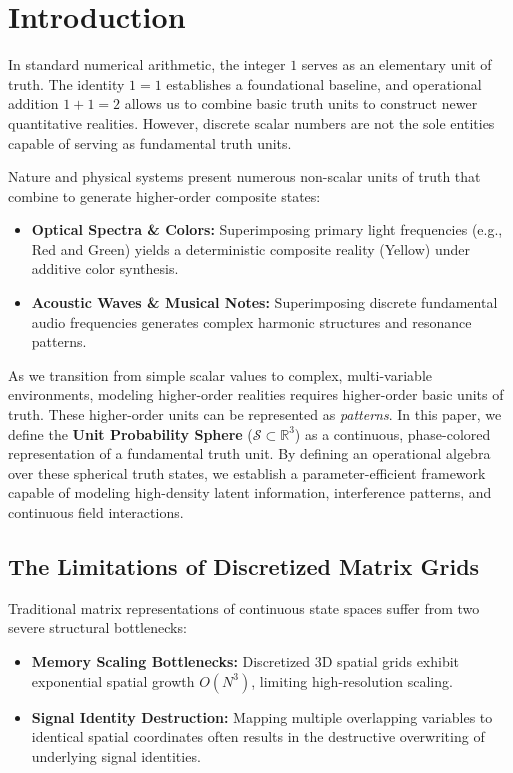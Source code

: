 \documentclass[12pt, a4paper]{article}
\begin{document}
\section{Introduction}

In standard numerical arithmetic, the integer $1$ serves as an elementary unit of truth. The identity $1 = 1$ establishes a foundational baseline, and operational addition $1 + 1 = 2$ allows us to combine basic truth units to construct newer quantitative realities. However, discrete scalar numbers are not the sole entities capable of serving as fundamental truth units.

Nature and physical systems present numerous non-scalar units of truth that combine to generate higher-order composite states:
\begin{itemize}
    \item \textbf{Optical Spectra \& Colors:} Superimposing primary light frequencies (e.g., Red and Green) yields a deterministic composite reality (Yellow) under additive color synthesis.
    \item \textbf{Acoustic Waves \& Musical Notes:} Superimposing discrete fundamental audio frequencies generates complex harmonic structures and resonance patterns.
\end{itemize}

As we transition from simple scalar values to complex, multi-variable environments, modeling higher-order realities requires higher-order basic units of truth. These higher-order units can be represented as \textit{patterns}. In this paper, we define the \textbf{Unit Probability Sphere} ($\mathcal{S} \subset \mathbb{R}^3$) as a continuous, phase-colored representation of a fundamental truth unit. By defining an operational algebra over these spherical truth states, we establish a parameter-efficient framework capable of modeling high-density latent information, interference patterns, and continuous field interactions.

\subsection{The Limitations of Discretized Matrix Grids}
Traditional matrix representations of continuous state spaces suffer from two severe structural bottlenecks:
\begin{itemize}
    \item \textbf{Memory Scaling Bottlenecks:} Discretized 3D spatial grids exhibit exponential spatial growth $O(N^3)$, limiting high-resolution scaling.
    \item \textbf{Signal Identity Destruction:} Mapping multiple overlapping variables to identical spatial coordinates often results in the destructive overwriting of underlying signal identities.
\end{itemize}
\end{document}
